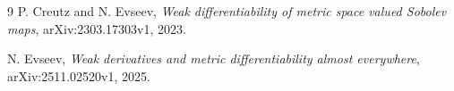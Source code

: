 \documentclass[11pt]{article}
\theoremstyle{remark}
\begin{document}
\begin{thebibliography}{9}
P. Creutz and N. Evseev,
\emph{Weak differentiability of metric space valued Sobolev maps},
arXiv:2303.17303v1, 2023.

N. Evseev,
\emph{Weak derivatives and metric differentiability almost everywhere},
arXiv:2511.02520v1, 2025.
\end{thebibliography}
\end{document}
